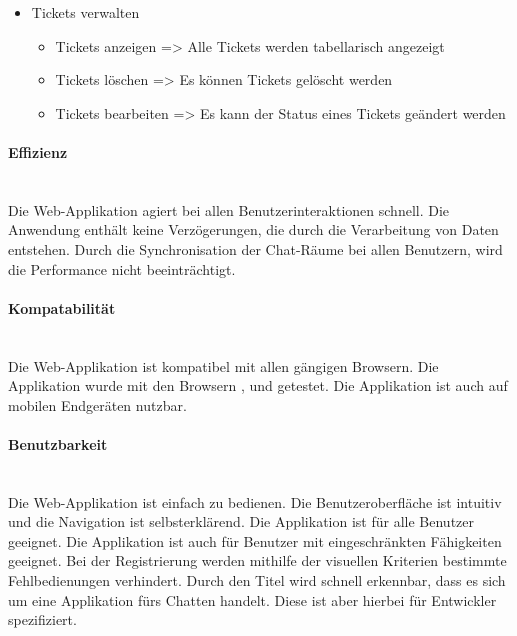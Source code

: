 \begin{itemize}
\begin{itemize}
    \item Tickets verwalten
      \begin{itemize}
        \item Tickets anzeigen
        \newline
        => Alle Tickets werden tabellarisch angezeigt
        \item Tickets löschen
        \newline
        => Es können Tickets gelöscht werden
        \item Tickets bearbeiten
        \newline
        => Es kann der Status eines Tickets geändert werden
      \end{itemize}  
    \end{itemize}   
\end{itemize}

\paragraph{Effizienz}\mbox{} \\
\noindent
Die Web-Applikation agiert bei allen Benutzerinteraktionen schnell. Die Anwendung enthält keine Verzögerungen, die durch die Verarbeitung von Daten entstehen. Durch die Synchronisation der Chat-Räume bei allen Benutzern, wird die Performance nicht beeinträchtigt.

\paragraph{Kompatabilität}\mbox{} \\
\noindent
Die Web-Applikation ist kompatibel mit allen gängigen Browsern.
Die Applikation wurde mit den Browsern ,  und  getestet.
Die Applikation ist auch auf mobilen Endgeräten nutzbar.

\paragraph{Benutzbarkeit}\mbox{} \\
\noindent
Die Web-Applikation ist einfach zu bedienen. 
Die Benutzeroberfläche ist intuitiv und die Navigation ist selbsterklärend.
Die Applikation ist für alle Benutzer geeignet.
Die Applikation ist auch für Benutzer mit eingeschränkten Fähigkeiten geeignet.
Bei der Registrierung werden mithilfe der visuellen Kriterien bestimmte Fehlbedienungen verhindert.
Durch den Titel  wird schnell erkennbar, dass es sich um eine Applikation fürs Chatten handelt.
Diese ist aber hierbei für Entwickler spezifiziert.

